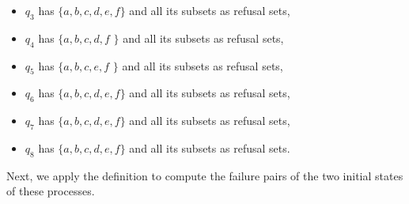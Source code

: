\documentclass[11pt]{article}
\newcommand{\cmark}{\ding{51}}
\theoremstyle{definition}
\theoremstyle{plain}
\begin{document}
\begin{itemize}
\begin{itemize}
		\item $ q_3 $ has $ \{a, b, c, d, e, f\} $ and all its subsets as refusal sets,
		\item $ q_4 $ has $ \{a, b, c, d, f$ \cmark $\} $ and all its subsets as refusal sets,
		\item $ q_5 $ has $ \{a, b, c, e, f$ \cmark $\} $ and all its subsets as refusal sets,
		\item $ q_6 $ has $ \{a, b, c, d, e, f\} $ and all its subsets as refusal sets,
		\item $ q_7 $ has $ \{a, b, c, d, e, f\} $ and all its subsets as refusal sets,
		\item $ q_8 $ has $ \{a, b, c, d, e, f\} $ and all its subsets as refusal sets.
	\end{itemize}
\end{itemize}

Next, we apply the definition to compute the failure pairs of the two initial states of these processes.
\end{document}
